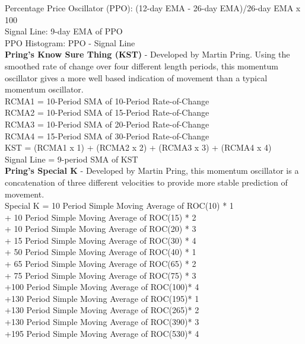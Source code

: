 \documentclass[12pt,a4paper]{article}
\begin{document}
\noindent
Percentage Price Oscillator (PPO): {(12-day EMA - 26-day EMA)/26-day EMA} x 100 \\
Signal Line: 9-day EMA of PPO \\
PPO Histogram: PPO - Signal Line \\

\iffalse
[]
\fi

\noindent
\textbf{Pring's Know Sure Thing (KST)} - Developed by Martin Pring. Using the smoothed rate of change over four different length periods, this momentum oscillator gives a more well based indication of movement than a typical momentum oscillator. \\

\noindent
RCMA1 = 10-Period SMA of 10-Period Rate-of-Change \\
RCMA2 = 10-Period SMA of 15-Period Rate-of-Change \\
RCMA3 = 10-Period SMA of 20-Period Rate-of-Change \\
RCMA4 = 15-Period SMA of 30-Period Rate-of-Change \\
KST = (RCMA1 x 1) + (RCMA2 x 2) + (RCMA3 x 3) + (RCMA4 x 4) \\
Signal Line = 9-period SMA of KST \\

\iffalse
[]
\fi

\noindent
\textbf{Pring's Special K} - Developed by Martin Pring, this momentum oscillator is a concatenation of three different velocities to provide more stable prediction of movement. \\

\noindent
Special K = 10 Period Simple Moving Average of ROC(10) * 1 \\
            + 10 Period Simple Moving Average of ROC(15) * 2 \\
            + 10 Period Simple Moving Average of ROC(20) * 3 \\
            + 15 Period Simple Moving Average of ROC(30) * 4 \\
            + 50 Period Simple Moving Average of ROC(40) * 1 \\
            + 65 Period Simple Moving Average of ROC(65) * 2 \\
            + 75 Period Simple Moving Average of ROC(75) * 3 \\
            +100 Period Simple Moving Average of ROC(100)* 4 \\
            +130 Period Simple Moving Average of ROC(195)* 1 \\
            +130 Period Simple Moving Average of ROC(265)* 2 \\
            +130 Period Simple Moving Average of ROC(390)* 3 \\
            +195 Period Simple Moving Average of ROC(530)* 4 \\
\end{document}

